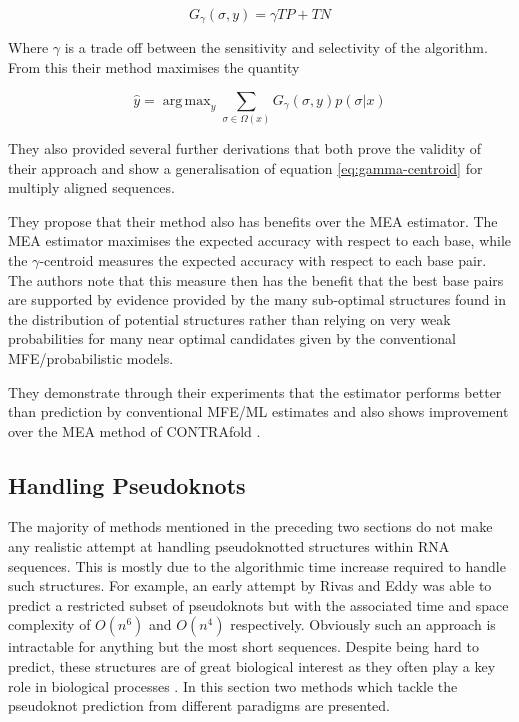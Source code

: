 \documentclass[journal]{IEEEtran}
\DeclareMathOperator*{\argmax}{arg\,max}
\begin{document}
\begin{equation}
	G_\gamma(\sigma, y) = \gamma TP + TN
\end{equation}

Where $\gamma$ is a trade off  between the sensitivity and selectivity of the algorithm. From this their method maximises the quantity

\begin{equation}
\label{eq:gamma-centroid}
	\hat{y} = \argmax_{y} \sum_{\sigma \in \Omega(x)} G_\gamma(\sigma, y) p(\sigma | x)
\end{equation}

They also provided several further derivations that both prove the validity of their approach and show a generalisation of equation \ref{eq:gamma-centroid} for multiply aligned sequences.

They propose that their method also has benefits over the MEA estimator. The MEA estimator maximises the expected accuracy with respect to each base, while the $\gamma$-centroid measures the expected accuracy with respect to each base pair. The authors note that this measure then has the benefit that the best base pairs are supported by evidence provided by the many sub-optimal structures found in the distribution of potential structures rather than relying on very weak probabilities for many near optimal candidates given by the conventional MFE/probabilistic models. 

They demonstrate through their experiments that the estimator performs better than prediction by conventional MFE/ML estimates and also shows improvement over the MEA method of CONTRAfold \cite{do2006contrafold}.


\subsection{Handling Pseudoknots}
\label{subsec:secondary-pseudoknots}
The majority of methods mentioned in the preceding two sections do not make any realistic attempt at handling pseudoknotted structures within RNA sequences. This is mostly due to the algorithmic time increase required to handle such structures. For example, an early attempt by Rivas and Eddy \cite{rivas1999dynamic} was able to predict a restricted subset of pseudoknots but with the associated time and space complexity of $O(n^6)$ and $O(n^4)$ respectively. Obviously such an approach is intractable for anything but the most short sequences. Despite being hard to predict, these structures are of great biological interest as they often play a key role in biological processes \cite{chen2005functional, pleij1985new}. In this section two methods which tackle the pseudoknot prediction from different paradigms are presented.
\end{document}
